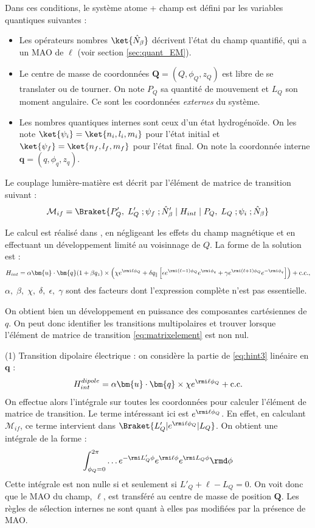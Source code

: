 Dans ces conditions, le système {atome + champ} est défini par les variables quantiques suivantes :
\begin{itemize}
\renewcommand{\labelitemi}{$\bullet$}
\setlength\itemsep{1em}
\item Les opérateurs nombres $\ket{\hat{N}_{\beta}}$ décrivent l'état du champ quantifié, qui a un MAO de $\ell$ (voir section \ref{sec:quant_EM}). 
\item Le centre de masse de coordonnées $\bm{Q}=(Q,\phi_Q,z_Q)$ est libre de se translater ou de tourner. On note $P_Q$ sa quantité de mouvement et $L_Q$ son moment angulaire. Ce sont les coordonnées \textit{externes} du système.
\item Les nombres quantiques internes sont ceux d'un état hydrogénoïde. On les note $\ket{\psi_i}=\ket{n_i,l_i,m_i}$ pour l'état initial et $\ket{\psi_f}=\ket{n_f,l_f,m_f}$ pour l'état final. On note la coordonnée interne $\bm{q} = (q,\phi_q,z_q)$.
\end{itemize}


Le couplage lumière-matière est décrit par l'élément de matrice de transition suivant :
\begin{equation}
\mathcal{M}_{if}=\Braket{P'_Q,\;L'_Q\; ;\psi_f\; ;\hat{N}'_{\beta}\;|\;H_{int}\;|\;P_Q,\;L_Q\; ;\psi_i\; ;\hat{N}_{\beta}}
\label{eq:matrixelement}
\end{equation}

Le calcul est réalisé dans , en négligeant les effets du champ magnétique et en effectuant un développement limité au voisinnage de $Q$. La forme de la solution est :
\begin{equation}
H_{int} = \alpha\bm{u}\cdot\bm{q}(1+\beta q_z)\times\left(\chi e^{\rmi\ell\phi_Q}+\delta q_{\parallel}\left[\epsilon e^{\rmi(\ell-1)\phi_Q}e^{\rmi \phi_q}+\gamma e^{\rmi(\ell+1)\phi_Q}e^{-\rmi \phi_q}\right]\right)+\text{c.c.},
\label{eq:hint3}
\end{equation}
$\alpha,\;\beta,\;\chi,\;\delta,\;\epsilon,\;\gamma$ sont des facteurs dont l'expression complète n'est pas essentielle.

On obtient bien un développement en puissance des composantes cartésiennes de $q$. On peut donc identifier les transitions multipolaires et trouver lorsque l'élément de matrice de transition \ref{eq:matrixelement} est non nul.

(1) Transition dipolaire électrique : on considère la partie de \ref{eq:hint3} linéaire en $\bm{q}$ : 
\[H^{dipole}_{int} = \alpha\bm{u}\cdot\bm{q}\times\chi e^{\rmi\ell\phi_Q}+\text{c.c.}\]
On effectue alors l'intégrale sur toutes les coordonnées pour calculer l'élément de matrice de transition. Le terme intéressant ici est $e^{\rmi\ell\phi_Q}$. En effet, en calculant $\mathcal{M}_{if}$, ce terme intervient dans $\Braket{L'_Q|e^{\rmi\ell\phi_Q}|L_Q}$. On obtient une intégrale de la forme :
\[\int_{\phi_Q=0}^{2\pi} \ldots e^{-\rmi L'_Q\phi}e^{\rmi\ell\phi}e^{\rmi L_Q\phi} \rmd\phi\]
Cette intégrale est non nulle si et seulement si $L'_Q+\ell-L_Q=0$. On voit donc que le MAO du champ, $\ell$, est transféré au centre de masse de position $\bm{Q}$. Les règles de sélection internes ne sont quant à elles pas modifiées par la présence de MAO.

